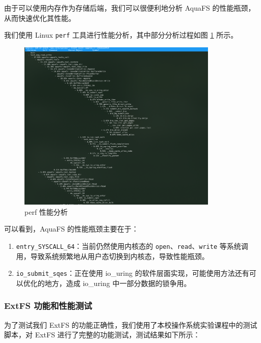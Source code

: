 由于可以使用内存作为存储后端，我们可以很便利地分析 AquaFS 的性能瓶颈，从而快速优化其性能。

我们使用 Linux \verb|perf| 工具进行性能分析，其中部分分析过程如图 \ref{test-perf} 所示。

\begin{figure}[htbp]
  \centering
  \includegraphics[width=0.85\textwidth]{fig/test-perf}
  \caption{ perf 性能分析 }
  \label{test-perf}
\end{figure}

可以看到，AquaFS 的性能瓶颈主要在于：

\begin{enumerate}
  \item \verb|entry_SYSCALL_64|：当前仍然使用内核态的 \verb|open|、\verb|read|、\verb|write| 等系统调用，导致系统频繁地从用户态切换到内核态，导致性能瓶颈。
  \item \verb|io_submit_sqes|：正在使用 io\_uring 的软件层面实现，可能使用方法还有可以优化的地方，造成 io\_uring 中一部分数据的锁争用。
\end{enumerate}

\subsubsection{ExtFS 功能和性能测试}

为了测试我们 ExtFS 的功能正确性，我们使用了本校操作系统实验课程中的测试脚本，对 ExtFS 进行了完整的功能测试，测试结果如下所示：

